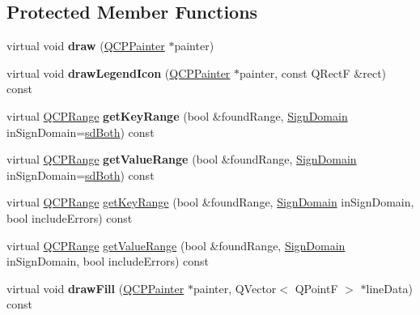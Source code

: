 \subsection*{Protected Member Functions}
\begin{DoxyCompactItemize}
\item 
\hypertarget{classQCPGraph_a659218cc62c2a7786213d9dd429c1c8d}{}virtual void {\bfseries draw} (\hyperlink{classQCPPainter}{Q\+C\+P\+Painter} $\ast$painter)\label{classQCPGraph_a659218cc62c2a7786213d9dd429c1c8d}

\item 
\hypertarget{classQCPGraph_a32115df0e940cf8ca7b687873c2d02ee}{}virtual void {\bfseries draw\+Legend\+Icon} (\hyperlink{classQCPPainter}{Q\+C\+P\+Painter} $\ast$painter, const Q\+Rect\+F \&rect) const \label{classQCPGraph_a32115df0e940cf8ca7b687873c2d02ee}

\item 
\hypertarget{classQCPGraph_afc246ce6201ff564ac440efaec52ab11}{}virtual \hyperlink{classQCPRange}{Q\+C\+P\+Range} {\bfseries get\+Key\+Range} (bool \&found\+Range, \hyperlink{classQCPAbstractPlottable_a661743478a1d3c09d28ec2711d7653d8}{Sign\+Domain} in\+Sign\+Domain=\hyperlink{classQCPAbstractPlottable_a661743478a1d3c09d28ec2711d7653d8a082b98cfb91a7363a3b5cd17b0c1cd60}{sd\+Both}) const \label{classQCPGraph_afc246ce6201ff564ac440efaec52ab11}

\item 
\hypertarget{classQCPGraph_a856e90b8ab6b31c344b14a863ab9e5d2}{}virtual \hyperlink{classQCPRange}{Q\+C\+P\+Range} {\bfseries get\+Value\+Range} (bool \&found\+Range, \hyperlink{classQCPAbstractPlottable_a661743478a1d3c09d28ec2711d7653d8}{Sign\+Domain} in\+Sign\+Domain=\hyperlink{classQCPAbstractPlottable_a661743478a1d3c09d28ec2711d7653d8a082b98cfb91a7363a3b5cd17b0c1cd60}{sd\+Both}) const \label{classQCPGraph_a856e90b8ab6b31c344b14a863ab9e5d2}

\item 
virtual \hyperlink{classQCPRange}{Q\+C\+P\+Range} \hyperlink{classQCPGraph_aa75c6f028124032416a5cf7145dfba60}{get\+Key\+Range} (bool \&found\+Range, \hyperlink{classQCPAbstractPlottable_a661743478a1d3c09d28ec2711d7653d8}{Sign\+Domain} in\+Sign\+Domain, bool include\+Errors) const 
\item 
virtual \hyperlink{classQCPRange}{Q\+C\+P\+Range} \hyperlink{classQCPGraph_ab964a21d680af93435d68126d8c5ab29}{get\+Value\+Range} (bool \&found\+Range, \hyperlink{classQCPAbstractPlottable_a661743478a1d3c09d28ec2711d7653d8}{Sign\+Domain} in\+Sign\+Domain, bool include\+Errors) const 
\item 
\hypertarget{classQCPGraph_ad6d07926e6d6b7cfa70258780d47b7a0}{}virtual void {\bfseries draw\+Fill} (\hyperlink{classQCPPainter}{Q\+C\+P\+Painter} $\ast$painter, Q\+Vector$<$ Q\+Point\+F $>$ $\ast$line\+Data) const \label{classQCPGraph_ad6d07926e6d6b7cfa70258780d47b7a0}


\end{DoxyCompactItemize}
